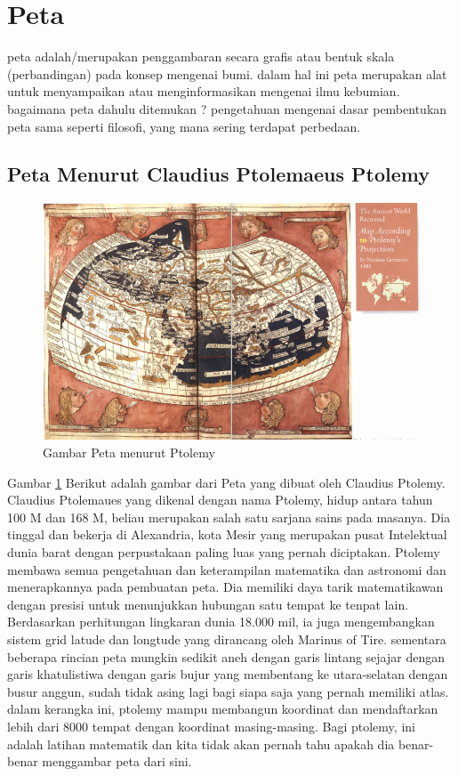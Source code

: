 
\section{Peta}
	peta adalah/merupakan penggambaran secara grafis atau bentuk skala (perbandingan) pada konsep mengenai bumi. dalam hal ini peta merupakan alat untuk menyampaikan atau menginformasikan mengenai ilmu kebumian. bagaimana peta dahulu ditemukan ? pengetahuan mengenai dasar pembentukan peta sama seperti filosofi, yang mana sering terdapat perbedaan.

\subsection{Peta Menurut Claudius Ptolemaeus Ptolemy}
	\begin{figure} [ht]
	\centerline{\includegraphics[width=1\textwidth]{figures/PetaPtolemy.PNG}}
	\caption{Gambar Peta menurut Ptolemy}
	\label{PetaPtolemy}
	\end{figure}
	Gambar \ref {PetaPtolemy} Berikut adalah gambar dari Peta yang dibuat oleh Claudius Ptolemy.
	Claudius Ptolemaues yang dikenal dengan nama Ptolemy, hidup antara tahun 100 M dan 168 M, beliau merupakan salah satu sarjana sains pada masanya. Dia tinggal dan bekerja di Alexandria, kota Mesir yang merupakan pusat Intelektual dunia barat dengan perpustakaan paling luas yang pernah diciptakan. Ptolemy membawa semua pengetahuan dan keterampilan matematika dan astronomi dan menerapkannya pada pembuatan peta. Dia memiliki daya tarik matematikawan dengan presisi untuk menunjukkan hubungan satu tempat ke tenpat lain. Berdasarkan perhitungan lingkaran dunia 18.000 mil, ia juga mengembangkan sistem grid latude dan longtude yang dirancang oleh Marinus of Tire. sementara beberapa rincian peta mungkin sedikit aneh dengan garis lintang sejajar dengan garis khatulistiwa dengan garis bujur yang membentang ke utara-selatan dengan busur anggun, sudah tidak asing lagi bagi siapa saja yang pernah memiliki atlas. dalam kerangka ini, ptolemy mampu membangun koordinat dan mendaftarkan lebih dari 8000 tempat dengan koordinat masing-masing. Bagi ptolemy, ini adalah latihan matematik dan kita tidak akan pernah tahu apakah dia benar-benar menggambar peta dari sini.
